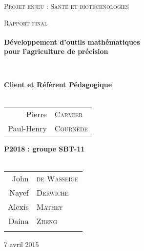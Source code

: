 \begin{titlepage}
\begin{center}


\vfill 

\textsc{\Large Projet enjeu : Santé et biotechnologies}\\[0.5cm]

\vfill

\textsc{\Large Rapport final}\\[1.5cm] 

\HRule \\[0.4cm]
{ \LARGE \bfseries Développement d'outils mathématiques \\ 
   pour l'agriculture de précision \\[0.4cm] }

\HRule \\[1.5cm]

\vfill

{\large
\begin{center}
  \textbf{Client et Référent Pédagogique} \\~\\
\begin{tabular}{rl}
   \quad Pierre &\textsc{Carmier} \\
    \quad Paul-Henry &\textsc{Courn\`ede} \\
  
\end{tabular}
\end{center}
\vfill
\begin{center}
  \textbf{P2018 : groupe SBT-11} \\~\\
  
\begin{tabular}{rl}

    \quad John &\textsc{de Wasseige} \\
    \quad Nayef &\textsc{Derwiche} \\
    \quad Alexis &\textsc{Mathey} \\
    \quad Daina &\textsc{Zheng} \\ \\
\end{tabular}
\end{center}
}

\vfill

{\large 7 avril 2015}

\end{center}
\end{titlepage}